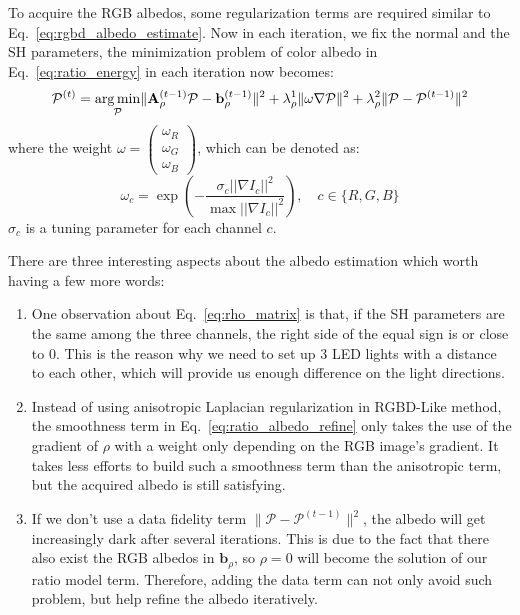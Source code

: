 To acquire the RGB albedos, some regularization terms are required similar to Eq.~\ref{eq:rgbd_albedo_estimate}. Now in each iteration, we fix the normal and the SH parameters, the minimization problem of color albedo in Eq.~\ref{eq:ratio_energy} in each iteration now becomes:
\begin{equation}\label{eq:ratio_albedo_refine}
    \mathcal{P}^{(t)} = 
    \operatorname*{arg\,min}_{\mathcal{P}} \lVert\mathbf{A}_{\rho}^{(t-1)}\mathcal{P} - \mathbf{b}_{\rho}^{(t-1)}\rVert^2 
    + \lambda_{\rho}^1 \lVert \omega \nabla \mathcal{P} \rVert^2  
    + \lambda_{\rho}^2 \lVert \mathcal{P} - \mathcal{P}^{(t-1)}\rVert^2
\end{equation}
where the weight $\omega = \begin{pmatrix} \omega_R\\ \omega_G\\ \omega_B \end{pmatrix}$, which can be denoted as:
\begin{equation}
\omega_c = \exp(- \frac{\sigma_c ||\nabla I_c||^2}{\max ||\nabla I_c||^2}), \quad c \in \{R,G,B\}
\end{equation}
$\sigma_c$ is a tuning parameter for each channel $c$.  

There are three interesting aspects about the albedo estimation which worth having a few more words:
\begin{enumerate}
    \item One observation about Eq.~\ref{eq:rho_matrix} is that, if the SH parameters are the same among the three channels, the right side of the equal sign is or close to 0. 
    This is the reason why we need to set up 3 LED lights with a distance to each other, which will provide us enough difference on the light directions.
    \item Instead of using anisotropic Laplacian regularization in RGBD-Like method, the smoothness term in Eq.~\ref{eq:ratio_albedo_refine} only takes the use of the gradient of $\rho$ with a weight only depending on the RGB image's gradient.
    It takes less efforts to build such a smoothness term than the anisotropic term, but the acquired albedo is still satisfying.
    \item If we don't use a data fidelity term $\lVert \mathcal{P} - \mathcal{P}^{(t-1)}\rVert^2$, the albedo will get increasingly dark after several iterations. 
    This is due to the fact that there also exist the RGB albedos in $\mathbf{b}_{\rho}$, so $\rho = 0$ will become the solution of our ratio model term.
    Therefore, adding the data term can not only avoid such problem, but help refine the albedo iteratively. 
\end{enumerate}

